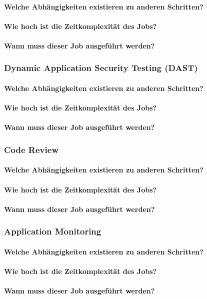 \paragraph{Welche Abhängigkeiten existieren zu anderen Schritten?}
\paragraph{Wie hoch ist die Zeitkomplexität des Jobs?}
\paragraph{Wann muss dieser Job ausgeführt werden?}

\subsubsection{Dynamic Application Security Testing (DAST)}
\paragraph{Welche Abhängigkeiten existieren zu anderen Schritten?}
\paragraph{Wie hoch ist die Zeitkomplexität des Jobs?}
\paragraph{Wann muss dieser Job ausgeführt werden?}

\subsubsection{Code Review}
\paragraph{Welche Abhängigkeiten existieren zu anderen Schritten?}
\paragraph{Wie hoch ist die Zeitkomplexität des Jobs?}
\paragraph{Wann muss dieser Job ausgeführt werden?}

\subsubsection{Application Monitoring}
\paragraph{Welche Abhängigkeiten existieren zu anderen Schritten?}
\paragraph{Wie hoch ist die Zeitkomplexität des Jobs?}
\paragraph{Wann muss dieser Job ausgeführt werden?}
